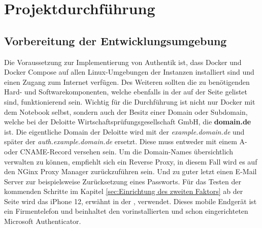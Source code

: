 \section{Projektdurchführung} 
\label{sec:Projektdurchführung}

\subsection{Vorbereitung der Entwicklungsumgebung}
\label{sec:Vorbereitung der Entwicklungsumgebung}
Die Voraussetzung zur Implementierung von Authentik ist, dass Docker und Docker Compose auf allen Linux-Umgebungen der 
Instanzen installiert sind und einen Zugang zum Internet verfügen. Des Weiteren sollten die zu 
benötigenden Hard- und Softwarekomponenten, welche ebenfalls in der  auf der Seite \pageref{sec:Sachmittelplanung} 
gelistet sind, funktionierend sein. Wichtig für die Durchführung ist nicht nur Docker mit dem Notebook selbst, sondern auch der 
Besitz einer Domain oder Subdomain, welche bei der Deloitte Wirtschaftsprüfungsgesellschaft GmbH, die \textbf{domain.de} ist. 
Die eigentliche Domain der Deloitte wird mit der \textit{example.domain.de} und später der \textit{auth.example.domain.de} ersetzt.
Diese muss entweder mit einem A- oder CNAME-Record versehen sein. Um die Domain-Names übersichtlich verwalten zu können, 
empfiehlt sich ein Reverse Proxy, in diesem Fall wird es auf den NGinx Proxy Manager zurückzuführen sein. Und zu guter letzt einen  
E-Mail Server zur beispielsweise Zurücksetzung eines Passworts. Für das Testen der kommenden Schritte im Kapitel 
\ref{sec:Einrichtung des zweiten Faktors}  ab der Seite 
\pageref{sec:Einrichtung des zweiten Faktors} wird das iPhone 12, erwähnt in der , verwendet. 
Dieses mobile Endgerät ist ein Firmentelefon und beinhaltet den vorinstallierten und schon eingerichteten Microsoft Authenticator. 

